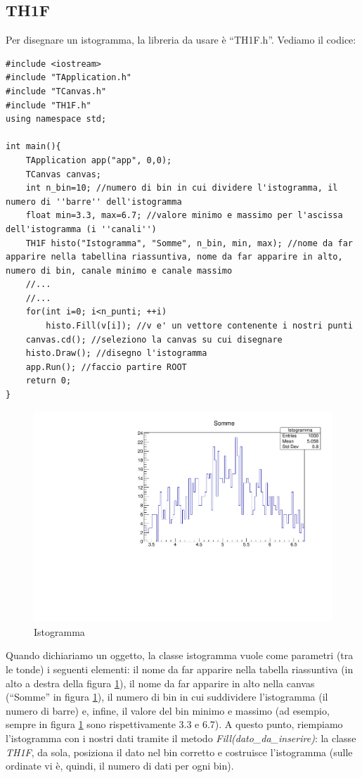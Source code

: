 \subsection{TH1F}
Per disegnare un istogramma, la libreria da usare è ``TH1F.h''. Vediamo il codice:
\begin{lstlisting}
#include <iostream>
#include "TApplication.h"
#include "TCanvas.h"
#include "TH1F.h"
using namespace std;

int main(){
	TApplication app("app", 0,0);
	TCanvas canvas;
	int n_bin=10; //numero di bin in cui dividere l'istogramma, il numero di ''barre'' dell'istogramma
	float min=3.3, max=6.7; //valore minimo e massimo per l'ascissa dell'istogramma (i ''canali'')
	TH1F histo("Istogramma", "Somme", n_bin, min, max); //nome da far apparire nella tabellina riassuntiva, nome da far apparire in alto, numero di bin, canale minimo e canale massimo
	//...
	//...
	for(int i=0; i<n_punti; ++i)
		histo.Fill(v[i]); //v e' un vettore contenente i nostri punti
	canvas.cd(); //seleziono la canvas su cui disegnare
	histo.Draw(); //disegno l'istogramma
	app.Run(); //faccio partire ROOT
	return 0;	
}
\end{lstlisting}
\begin{figure} [h!]
	\centering
	\includegraphics[scale=\scaledim]{Immagini/histo.pdf}  
	\caption{Istogramma}
	\label{root3}
\end{figure}
Quando dichiariamo un oggetto, la classe istogramma vuole come parametri  (tra le tonde) i seguenti elementi: il nome da far apparire nella tabella riassuntiva (in alto a destra della figura \ref{root3}), il nome da far apparire in alto nella canvas (``Somme'' in figura \ref{root3}), il numero di bin in cui suddividere l'istogramma (il numero di barre) e, infine, il valore del bin minimo e massimo (ad esempio, sempre in figura \ref{root3} sono rispettivamente 3.3 e 6.7). A questo punto, riempiamo l'istogramma con i nostri dati tramite il metodo \emph{Fill(\emph{dato\_da\_inserire})}: la classe \emph{TH1F}, da sola, posiziona il dato nel bin corretto e costruisce l'istogramma (sulle ordinate vi è, quindi, il numero di dati per ogni bin).

